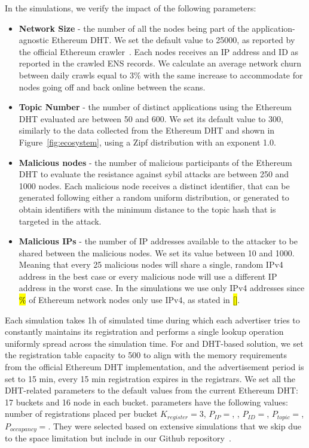 In the simulations, we verify the impact of the following parameters:
 \begin{itemize}
     \item \textbf{Network Size} - the number of all the nodes being part of the application-agnostic Ethereum DHT. We set the default value to 25000, as reported by the official Ethereum crawler~\cite{discv4-dns-lists}. Each nodes receives an IP address and ID as reported in the crawled ENS records. We calculate an average network churn between daily crawls equal to 3\% with the same increase to accommodate for nodes going off and back online between the scans. 
     \item \textbf{Topic Number} - the number of distinct applications using the Ethereum DHT evaluated are between 50 and 600. We set its default value to 300, similarly to the data collected from the Ethereum DHT and shown in Figure~\ref{fig:ecosystem}, using a Zipf distribution with an exponent 1.0.
     \item \textbf{Malicious nodes} - the number of malicious participants of the Ethereum DHT to evaluate the resistance against sybil attacks are between 250 and 1000 nodes.  Each malicious node receives a distinct identifier, that can be generated following either a random uniform distribution,  or generated to obtain identifiers with the minimum distance to the topic hash that is targeted in the attack.
     \item \textbf{Malicious IPs} - the number of IP addresses available to the attacker to be shared between the malicious nodes. We set its value between 10 and 1000.  Meaning that every 25 malicious nodes will share a single, random IPv4 address in the best case or every malicious node will use a different IP address in the worst case.  In the simulations we use only IPv4 addresses since \hl{\%} of Ethereum network nodes only use IPv4, as stated in \hl{[]}.
 \end{itemize}

Each simulation takes 1h of simulated time during which each advertiser tries to constantly maintains its registration and performs a single lookup operation uniformly spread across the simulation time.  For \sysname and DHT-based solution, we set the registration table capacity to 500  to align with the memory requirements from the official Ethereum DHT implementation, and the advertisement period is set to 15 min, \ie every 15 min registration expires in the registrars. 
We set all the DHT-related parameters to the default values from the current Ethereum DHT: 17 buckets and 16 node in each bucket.
 \sysname parameters have the following values: number of registrations placed per bucket $K_{register}= 3$, $P_{IP} = $, , $P_{ID} = $, $P_{topic} = $, $P_{occupancy} = $. 
They were selected based on extensive simulations that we skip due to the space limitation but include in our Github repository~\cite{our_repo}. 

